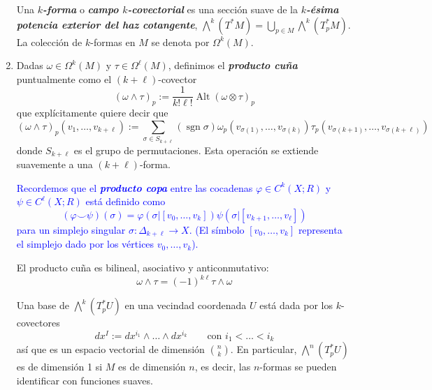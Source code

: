 \documentclass[spanish]{article}
\theoremstyle{definition}
\newcommand{\R}{\mathbb{R}}
\DeclareMathOperator{\sgn}{sgn}
\begin{document}
\begin{enumerate}
		Una \textbf{\textit{$k$-forma}} o \textbf{\textit{campo $k$-covectorial}} es una
		sección suave de la \textbf{\textit{$k$-ésima potencia exterior del haz cotangente}}, $\bigwedge^k(T^*M)=\bigcup_{p\in M}\bigwedge^k(T_p^*M)$.  La colección de $k$-formas en $M$ se denota por $\Omega^k(M)$.
		
		
		\item Dadas $\omega\in\Omega^k(M)$ y $\tau\in\Omega^\ell(M)$, definimos el \textbf{\textit{producto cuña}} puntualmente como el $(k+\ell)$-covector
		\[(\omega\wedge\tau)_p:=\frac{1}{k!\ell!}\operatorname{Alt}(\omega\otimes\tau)_p\]
		que explícitamente quiere decir que
		\[(\omega\wedge\tau)_p(v_1,\ldots,v_{k+\ell}):=\sum_{\sigma\in S_{k+\ell}}(\sgn\sigma)\omega_p(v_{\sigma(1)},\ldots,v_{\sigma(k)})\tau_p(v_{\sigma(k+1)},\ldots,v_{\sigma(k+\ell)})\]
		donde $S_{k+\ell}$ es el grupo de permutaciones. Esta operación se extiende suavemente a una $(k+\ell)$-forma.
		
		\textcolor{blue}{Recordemos que el \textbf{\textit{producto copa}} entre las cocadenas $\varphi\in C^k(X;R)$ y $\psi\in C^\ell(X;R)$ está definido como
			\[(\varphi\smile \psi)(\sigma)=\varphi(\sigma|[v_0,\ldots,v_k])\psi(\sigma|[v_{k+1},\ldots,v_{\ell}])\]
			para un simplejo singular $\sigma:\Delta_{k+\ell}\to X$. (El símbolo $[v_0,\ldots,v_k]$ representa el simplejo dado por los vértices $v_0,\ldots,v_k$).
		}
		
		El producto cuña es bilineal, asociativo y anticonmutativo:
		\[\omega\wedge\tau=(-1)^{k\ell}\tau\wedge\omega\]
		
		Una base de $\bigwedge^k(T_p^*U)$ en una vecindad coordenada $U$ está dada por los $k$-covectores
		\[dx^I:=dx^{i_1}\wedge\ldots\wedge dx^{i_k}\qquad \text{con }i_1<\ldots<i_k\]
		así que es un espacio vectorial de dimensión $\binom{n}{k}$. En particular, $\bigwedge^n(T_p^*U)$ es de dimensión 1 si $M$ es de dimensión $n$, es decir, las $n$-formas se pueden identificar con funciones suaves.
		\iffalse
		Conviene pensar en estos objetos , para los 1-covectores $\omega^1,\ldots,\omega^k$ y los vectores $v_1,\ldots,v_k$,
		\[\omega^1\wedge\ldots\wedge\omega^k(v_1,\ldots,v_k)=\det(\omega^i(v_j))\]
		Por ejemplo, en $\R^2$, $dx\wedge dy\left(\begin{pmatrix}
			v^1\\
			v^2
		\end{pmatrix},\begin{pmatrix}
			w^1\\
			w^2
		\end{pmatrix}\right)=v^1w^2-v^2w^1$.\fi
		

\end{enumerate}
\end{document}
